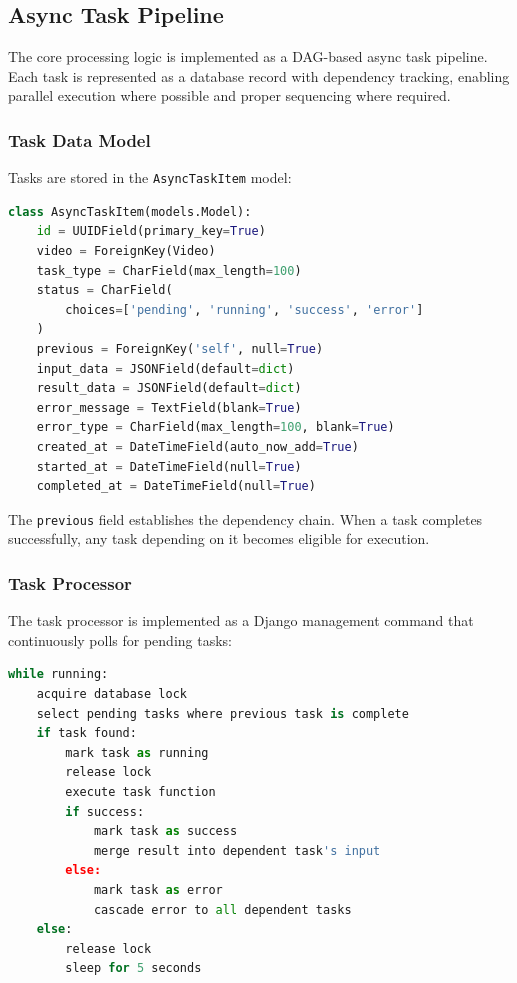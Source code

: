 \documentclass[12pt,a4paper]{article}
\begin{document}
\subsection{Async Task Pipeline}

The core processing logic is implemented as a DAG-based async task pipeline. Each task is represented as a database record with dependency tracking, enabling parallel execution where possible and proper sequencing where required.

\subsubsection{Task Data Model}

Tasks are stored in the \texttt{AsyncTaskItem} model:

\begin{lstlisting}[language=Python, caption={AsyncTaskItem Database Model}]
class AsyncTaskItem(models.Model):
    id = UUIDField(primary_key=True)
    video = ForeignKey(Video)
    task_type = CharField(max_length=100)
    status = CharField(
        choices=['pending', 'running', 'success', 'error']
    )
    previous = ForeignKey('self', null=True)
    input_data = JSONField(default=dict)
    result_data = JSONField(default=dict)
    error_message = TextField(blank=True)
    error_type = CharField(max_length=100, blank=True)
    created_at = DateTimeField(auto_now_add=True)
    started_at = DateTimeField(null=True)
    completed_at = DateTimeField(null=True)
\end{lstlisting}

The \texttt{previous} field establishes the dependency chain. When a task completes successfully, any task depending on it becomes eligible for execution.

\subsubsection{Task Processor}

The task processor is implemented as a Django management command that continuously polls for pending tasks:

\begin{lstlisting}[language=Python, caption={Async Task Processor Loop}, label={alg:task-processor}]
while running:
    acquire database lock
    select pending tasks where previous task is complete
    if task found:
        mark task as running
        release lock
        execute task function
        if success:
            mark task as success
            merge result into dependent task's input
        else:
            mark task as error
            cascade error to all dependent tasks
    else:
        release lock
        sleep for 5 seconds
\end{lstlisting}
\end{document}
